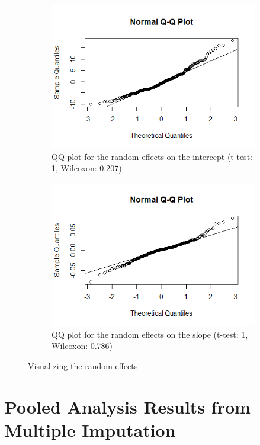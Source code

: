 \begin{figure}[H]
\centering
\begin{subfigure}{.4\textwidth}
  \centering
  \includegraphics[width=1\linewidth]{../../plots/qq_intercept.png}
  \caption{QQ plot for the random effects on the intercept (t-test: 1, Wilcoxon: 0.207)}
\end{subfigure}
\begin{subfigure}{.4\textwidth}
  \centering
  \includegraphics[width=1\linewidth]{../../plots/qq_slope.png}
  \caption{QQ plot for the random effects on the slope (t-test: 1, Wilcoxon: 0.786)}
\end{subfigure}
\caption{Visualizing the random effects}
\label{fig:re}
\end{figure}

\section{Pooled Analysis Results from Multiple Imputation}
